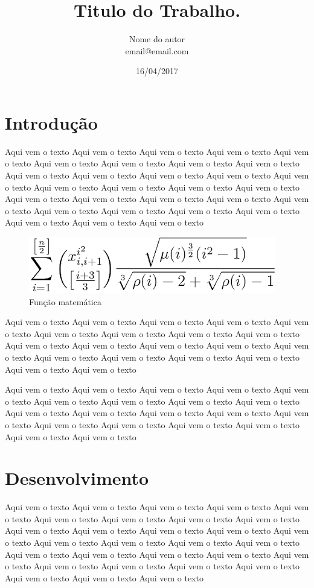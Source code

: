 \documentclass[a4paper, 12pt]{article}
\title{Titulo do Trabalho.}
\author{Nome do autor \\ email@email.com}
\date{16/04/2017}
\begin{document}
\maketitle \newpage

\tableofcontents \newpage

\listoffigures \newpage

\listoftables \newpage


\section{Introdução}
Aqui vem o texto Aqui vem o texto Aqui vem o texto Aqui vem o texto Aqui vem o texto 
Aqui vem o texto Aqui vem o texto Aqui vem o texto Aqui vem o texto Aqui vem o texto 
Aqui vem o texto Aqui vem o texto Aqui vem o texto Aqui vem o texto Aqui vem o texto 
Aqui vem o texto Aqui vem o texto Aqui vem o texto Aqui vem o texto Aqui vem o texto 
Aqui vem o texto Aqui vem o texto Aqui vem o texto Aqui vem o texto Aqui vem o texto 
Aqui vem o texto Aqui vem o texto Aqui vem o texto Aqui vem o texto Aqui vem o texto 
\begin{figure}[htb]
	\centering
	\includegraphics[scale=0.4]{Imagens/funcao.png}
	\caption{Função matemática}
	\label{figur}
\end{figure}

Aqui vem o texto Aqui vem o texto Aqui vem o texto Aqui vem o texto Aqui vem o texto 
Aqui vem o texto Aqui vem o texto Aqui vem o texto Aqui vem o texto Aqui vem o texto 
Aqui vem o texto Aqui vem o texto Aqui vem o texto Aqui vem o texto Aqui vem o texto 
Aqui vem o texto Aqui vem o texto Aqui vem o texto Aqui vem o texto Aqui vem o texto\cite{meuatalhoref} 

Aqui vem o texto Aqui vem o texto Aqui vem o texto Aqui vem o texto Aqui vem o texto 
Aqui vem o texto Aqui vem o texto Aqui vem o texto Aqui vem o texto Aqui vem o texto 
Aqui vem o texto Aqui vem o texto Aqui vem o texto Aqui vem o texto Aqui vem o texto 
Aqui vem o texto Aqui vem o texto Aqui vem o texto Aqui vem o texto Aqui vem o texto 


\section{Desenvolvimento}
Aqui vem o texto Aqui vem o texto Aqui vem o texto Aqui vem o texto Aqui vem o texto 
Aqui vem o texto Aqui vem o texto Aqui vem o texto Aqui vem o texto Aqui vem o texto 
Aqui vem o texto Aqui vem o texto Aqui vem o texto Aqui vem o texto Aqui vem o texto 
Aqui vem o texto Aqui vem o texto Aqui vem o texto Aqui vem o texto Aqui vem o texto 
Aqui vem o texto Aqui vem o texto Aqui vem o texto Aqui vem o texto Aqui vem o texto 
Aqui vem o texto Aqui vem o texto Aqui vem o texto Aqui vem o texto Aqui vem o texto 
\end{document}
